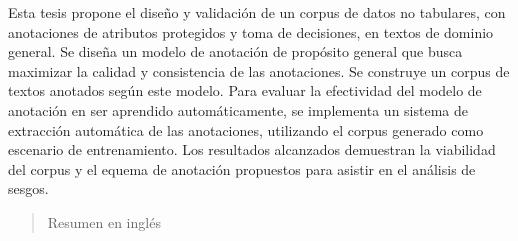 \begin{resumen}
	Esta tesis propone el dise\~no y validaci\'on de un corpus de datos no tabulares, con anotaciones de atributos protegidos y toma de decisiones, 
	en textos de dominio general. Se dise\~na un modelo de anotaci\'on de prop\'osito general que busca maximizar la calidad y consistencia de las 
	anotaciones. Se construye un corpus de textos anotados seg\'un este modelo. Para evaluar la efectividad del modelo de anotaci\'on en ser 
	aprendido autom\'aticamente, se implementa un sistema de extracci\'on autom\'atica de las anotaciones, utilizando el corpus generado como 
	escenario de entrenamiento. Los resultados alcanzados demuestran la viabilidad del corpus y el equema de anotaci\'on propuestos para asistir 
	en el an\'alisis de sesgos.



\end{resumen}

\begin{abstract}
	Resumen en inglés
\end{abstract}